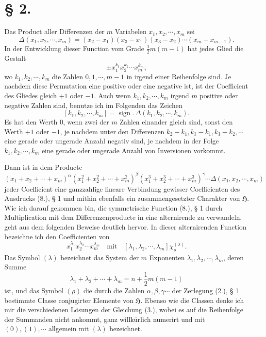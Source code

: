 \documentclass[11pt]{article}
\newcommand{\Hgr}{\mathfrak{H}}
\newcommand{\sign}{\operatorname{sign}}
\begin{document}
\section*{§ 2.}

Das Product aller Differenzen der $m$ Variabelen $x_1,x_2,\cdots,x_m$ sei
\[
 \Delta(x_1,x_2,\cdots,x_m)=(x_2-x_1)(x_3-x_1)(x_3-x_2)\cdots(x_m-x_{m-1}).
\]
In der Entwicklung dieser Function vom Grade $\frac12m(m-1)$ hat jedes Glied die Gestalt
\[
 \pm x_1^{k_1}x_2^{k_2}\cdots x_m^{k_m},
\]
wo $k_1,k_2,\cdots,k_m$ die Zahlen $0,1,\cdots,m-1$ in irgend einer Reihenfolge sind. Je nachdem diese Permutation eine positive oder eine negative ist, ist der Coefficient des Gliedes gleich $+1$ oder $-1$. Auch wenn $k_1,k_2,\cdots,k_m$ irgend $m$ positive oder negative Zahlen sind, benutze ich im Folgenden das Zeichen
\begin{equation}\tag{1.}
 [k_1,k_2,\cdots,k_m]=\sign.\,\Delta(k_1,k_2,\cdots,k_m).
\end{equation}
Es hat den Werth $0$, wenn zwei der $m$ Zahlen einander gleich sind, sonst den Werth $+1$ oder $-1$, je nachdem unter den Differenzen $k_2-k_1,k_3-k_1,k_3-k_2,\cdots$ eine gerade oder ungerade Anzahl negativ sind, je nachdem in der Folge $k_1,k_2,\cdots,k_m$ eine gerade oder ungerade Anzahl von Inversionen vorkommt.

Dann ist in dem Producte
\begin{equation}\tag{2.}
 (x_1+x_2+\cdots+x_m)^\alpha(x_1^2+x_2^2+\cdots+x_m^2)^\beta(x_1^3+x_2^3+\cdots+x_m^3)^\gamma\cdots\Delta(x_1,x_2,\cdots,x_m)
\end{equation}
jeder Coefficient eine ganzzahlige lineare Verbindung gewisser Coefficienten des Ausdrucks (8.), § 1 und mithin ebenfalls ein zusammengesetzter Charakter von $\Hgr$. Wie ich darauf gekommen bin, die symmetrische Function (8.), § 1 durch Multiplication mit dem Differenzenproducte in eine alternirende zu verwandeln, geht aus dem folgenden Beweise deutlich hervor. In dieser alternirenden Function bezeichne ich den Coefficienten von
\[
 x_1^{\lambda_1}x_2^{\lambda_2}\cdots x_m^{\lambda_m}\quad\text{mit}\quad [\lambda_1,\lambda_2,\cdots,\lambda_m]\chi_\rho^{(\lambda)}.
\]
Das Symbol $(\lambda)$ bezeichnet das System der $m$ Exponenten $\lambda_1,\lambda_2,\cdots,\lambda_m$, deren Summe
\begin{equation}\tag{3.}
 \lambda_1+\lambda_2+\cdots+\lambda_m=n+\frac12m(m-1)
\end{equation}
ist, und das Symbol $(\rho)$ die durch die Zahlen $\alpha,\beta,\gamma\cdots$ der Zerlegung (2.), § 1 bestimmte Classe conjugirter Elemente von $\Hgr$. Ebenso wie die Classen denke ich mir die verschiedenen Lösungen der Gleichung (3.), wobei es auf die Reihenfolge der Summanden nicht ankommt, ganz willkürlich numerirt und mit $(0),(1),\cdots$ allgemein mit $(\lambda)$ bezeichnet.
\end{document}
